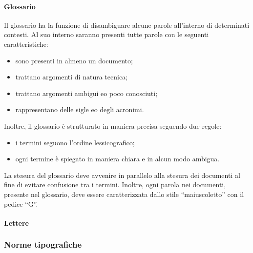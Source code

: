 			\paragraph{Glossario}
				Il glossario ha la funzione di disambiguare alcune parole all'interno di determinati contesti. Al suo interno saranno presenti tutte parole con le seguenti caratteristiche:
				\begin{itemize}
					\item sono presenti in almeno un documento;
					\item trattano argomenti di natura tecnica;
					\item trattano argomenti ambigui e\/o poco conosciuti;
					\item rappresentano delle sigle e\/o degli acronimi.
				\end{itemize}
				Inoltre, il glossario è strutturato in maniera precisa seguendo due regole:
				\begin{itemize}
					\item i termini seguono l'ordine lessicografico;
					\item ogni termine è spiegato in maniera chiara e in alcun modo ambigua.
				\end{itemize}
				La stesura del glossario deve avvenire in parallelo alla stesura dei documenti al fine di evitare confusione tra i termini. Inoltre, ogni parola nei documenti, presente nel glossario, deve essere caratterizzata dallo stile ``maiuscoletto'' con il pedice ``G''.
			\paragraph{Lettere}

		\subsubsection{Norme tipografiche}
